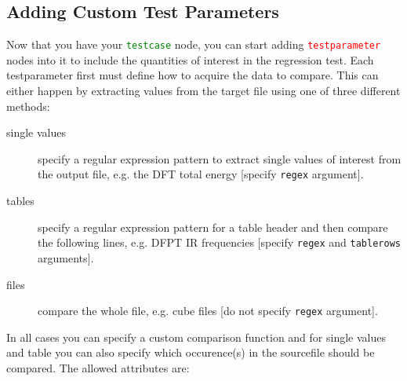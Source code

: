 \documentclass[a4paper,12pt]{scrartcl}
\newcommand{\testcase}{\textcolor{green}{\texttt{testcase}}}
\newcommand{\testparameter}{\textcolor{red}{\texttt{testparameter}}}
\begin{document}
\subsection{Adding Custom Test Parameters}
Now that you have your \testcase{} node, you can start adding \testparameter{} nodes into it to include the
quantities of interest in the regression test. Each testparameter first must define how to acquire the data to
compare. This can either happen by extracting values from the target file using one of three different methods:
\begin{description}
    \item[single values] specify a regular expression pattern to extract single values of interest from the output
        file, e.g. the DFT total energy [specify \texttt{regex} argument].
    \item[tables] specify a regular expression pattern for a table header and then compare the following lines, e.g.
        DFPT IR frequencies [specify \texttt{regex} and \texttt{tablerows} arguments].
    \item[files] compare the whole file, e.g. cube files [do not specify \texttt{regex} argument].
\end{description}
In all cases you can specify a custom comparison function and for single values and table you can also specify which
occurence(s) in the sourcefile should be compared. The allowed attributes are:
\end{document}

